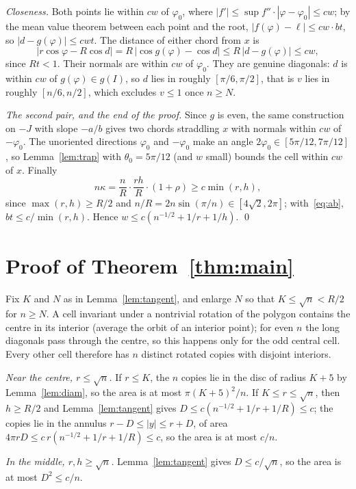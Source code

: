 \documentclass[11pt]{amsart}
\theoremstyle{remark}
\begin{document}
\emph{Closeness.} Both points lie within $cw$ of $\varphi_0$, where $|f'|\le\sup f''\cdot|\varphi-\varphi_0|\le cw$; by the mean value theorem between each point and the root, $|f(\varphi)-\ell|\le cw\cdot bt$, so $|d-g(\varphi)|\le cwt$. The distance of either chord from $x$ is
\[
|r\cos\varphi-R\cos d|=R\,|\cos g(\varphi)-\cos d|\le R\,|d-g(\varphi)|\le cw,
\]
since $Rt<1$. Their normals are within $cw$ of $\varphi_0$. They are genuine diagonals: $d$ is within $cw$ of $g(\varphi)\in g(I)$, so $d$ lies in roughly $[\pi/6,\pi/2]$, that is $v$ lies in roughly $[n/6,n/2]$, which excludes $v\le1$ once $n\ge N$.

\emph{The second pair, and the end of the proof.} Since $g$ is even, the same construction on $-J$ with slope $-a/b$ gives two chords straddling $x$ with normals within $cw$ of $-\varphi_0$. The unoriented directions $\varphi_0$ and $-\varphi_0$ make an angle $2\varphi_0\in[5\pi/12,7\pi/12]$, so Lemma~\ref{lem:trap} with $\theta_0=5\pi/12$ (and $w$ small) bounds the cell within $cw$ of $x$. Finally
\[
n\kappa=\frac nR\cdot\frac{rh}{R}\cdot(1+\rho)\ge c\min(r,h),
\]
since $\max(r,h)\ge R/2$ and $n/R=2n\sin(\pi/n)\in[4\sqrt2,2\pi]$; with~\eqref{eq:ab}, $bt\le c/\min(r,h)$. Hence $w\le c(n^{-1/2}+1/r+1/h)$. \qed

\section{Proof of Theorem~\ref{thm:main}}

Fix $K$ and $N$ as in Lemma~\ref{lem:tangent}, and enlarge $N$ so that $K\le\sqrt n<R/2$ for $n\ge N$. A cell invariant under a nontrivial rotation of the polygon contains the centre in its interior (average the orbit of an interior point); for even $n$ the long diagonals pass through the centre, so this happens only for the odd central cell. Every other cell therefore has $n$ distinct rotated copies with disjoint interiors.

\emph{Near the centre, $r\le\sqrt n$.} If $r\le K$, the $n$ copies lie in the disc of radius $K+5$ by Lemma~\ref{lem:diam}, so the area is at most $\pi(K+5)^2/n$. If $K\le r\le\sqrt n$, then $h\ge R/2$ and Lemma~\ref{lem:tangent} gives $D\le c(n^{-1/2}+1/r+1/R)\le c$; the copies lie in the annulus $r-D\le|y|\le r+D$, of area $4\pi rD\le c\,r(n^{-1/2}+1/r+1/R)\le c$, so the area is at most $c/n$.

\emph{In the middle, $r,h\ge\sqrt n$.} Lemma~\ref{lem:tangent} gives $D\le c/\sqrt n$, so the area is at most $D^2\le c/n$.
\end{document}
